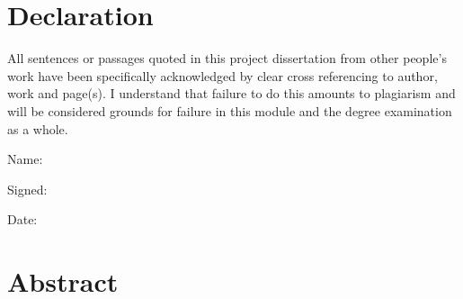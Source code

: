 \documentclass{report}
\begin{document}
\newenvironment{ddd}{\begin{rmdef}\rm}{\end{rmdef}}                             
\newenvironment{eee}{\begin{rmexa}\rm}{\end{rmexa}}                             
\newenvironment{rrr}{\begin{rmrem}\rm}{\end{rmrem}}                             
                                              
					                                        
\newenvironment{pf}[1][Proof]{                                                  
\par\noindent{\em #1}. }{\hfill\framebox(6,6)\par\medskip}                      
                                                                               





\chapter*{Declaration}                %
All sentences or passages quoted in this project dissertation from other
people's work have been specifically acknowledged by clear cross referencing
to author, work and page(s).  I understand that failure to do this amounts
to plagiarism and will be considered grounds for failure in this module and
the degree examination as a whole.

\bigskip

\noindent
Name:


\bigskip

\noindent
Signed:


\bigskip

\noindent
Date:


\chapter*{Abstract}
\end{document}
